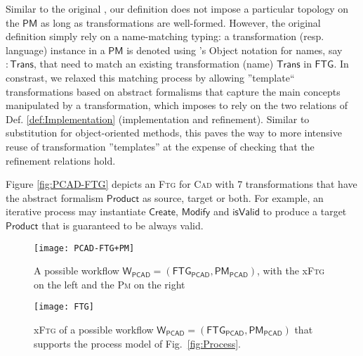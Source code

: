 Similar to the original  
\cite{Mustafiz-etAl:2012,Lucio-Mustafiz-etAl:2013,TR:Lucio-Mustafiz-etAl:2012},
our definition does not impose a particular topology on the $\mathsf{PM}$ as 
long as transformations are well-formed. However, the original definition 
simply rely on a name-matching typing: a transformation (resp. language) 
instance in a $\mathsf{PM}$ is denoted using \UML's Object notation for names, 
say $\mathsf{:Trans}$, that need to match an existing transformation (name) 
$\mathsf{Trans}$ in $\mathsf{FTG}$. In constrast, we relaxed this matching 
process by allowing ''template`` transformations based on abstract formalisms 
that capture the main concepts manipulated by a transformation, which imposes 
to rely on the two relations of Def. \ref{def:Implementation} (implementation 
and refinement). Similar to substitution for object-oriented methods, this 
paves the way to more intensive reuse of transformation ''templates'' at the 
expense of checking that the refinement relations hold.

\begin{Example}
   Figure \ref{fig:PCAD-FTG} depicts an \textsc{Ftg} for \textsc{Cad} with 7 
transformations that have the abstract formalism $\mathsf{Product}$ as source, 
target or both. For example, an iterative process may instantiate 
$\mathsf{Create}$, $\mathsf{Modify}$ and $\mathsf{isValid}$ to produce a target 
$\mathsf{Product}$ that is guaranteed to be always valid.  

\begin{olddef}

\begin{figure}[t]
   \centering
   \texttt{[image: PCAD-FTG+PM]}
   \caption{A possible workflow $\mathsf{W_{PCAD}} = (\mathsf{FTG_{PCAD}}, 
\mathsf{PM_{PCAD}})$, with the x\textsc{Ftg} on the left and the \textsc{Pm} 
on the right}%
   \label{fig:PCAD-MM}%
\end{figure}
\end{olddef}
\begin{newdef}
\begin{figure}[t]
   \centering
   \texttt{[image: FTG]}
   \caption{x\textsc{Ftg} of a possible workflow $\mathsf{W_{PCAD}} = (\mathsf{FTG_{PCAD}}, 
\mathsf{PM_{PCAD}})$ that supports the process model of Fig.~\ref{fig:Process}.}%
   \label{fig:PCAD-MM}%
\end{figure}
\end{newdef}
\end{Example}




